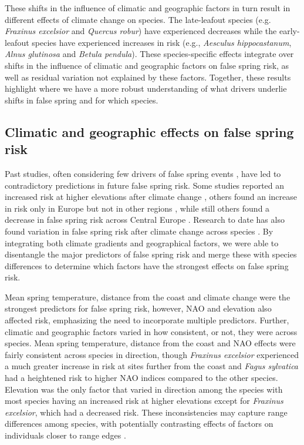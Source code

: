 \documentclass{article}\usepackage[]{graphicx}\usepackage[]{color}
\begin{document}
These shifts in the influence of climatic and geographic factors in turn result in different effects of climate change on species. The late-leafout species (e.g. \textit{Fraxinus excelsior} and \textit{Quercus robur}) have experienced decreases while the early-leafout species have experienced increases in risk (e.g., \textit{Aesculus hippocastanum}, \textit{Alnus glutinosa} and \textit{Betula pendula}). These species-specific effects integrate over shifts in the influence of climatic and geographic factors on false spring risk, as well as residual variation not explained by these factors. Together, these results highlight where we have a more robust understanding of what drivers underlie shifts in false spring and for which species. %

\subsection*{Climatic and geographic effects on false spring risk}
Past studies, often considering few drivers of false spring events \citep{Liu2018, Ma2018, Vitasse2018, Wypych2016a}, have led to contradictory predictions in future false spring risk. Some studies reported an increased risk at higher elevations after climate change \citep{Vitasse2018}, others found an increase in risk only in Europe but not in other regions \citep{Liu2018}, while still others found a decrease in false spring risk across Central Europe \citep{Wypych2016a}. Research to date has also found variation in false spring risk after climate change across species \citep{Ma2018}. By integrating both climate gradients and geographical factors, we were able to disentangle the major predictors of false spring risk and merge these with species differences to determine which factors have the strongest effects on false spring risk. 

Mean spring temperature, distance from the coast and climate change were the strongest predictors for false spring risk, however, NAO and elevation also affected risk, emphasizing the need to incorporate multiple predictors. Further, climatic and geographic factors varied in how consistent, or not, they were across species. Mean spring temperature, distance from the coast and NAO effects were fairly consistent across species in direction, though \textit{Fraxinus excelsior} experienced a much greater increase in risk at sites further from the coast and \textit{Fagus sylvatica} had a heightened risk to higher NAO indices compared to the other species. Elevation was the only factor that varied in direction among the species with most species having an increased risk at higher elevations except for \textit{Fraxinus excelsior}, which had a decreased risk. These inconsistencies may capture range differences among species, with potentially contrasting effects of factors on individuals closer to range edges \citep{Chuine2008}. 
\end{document}
